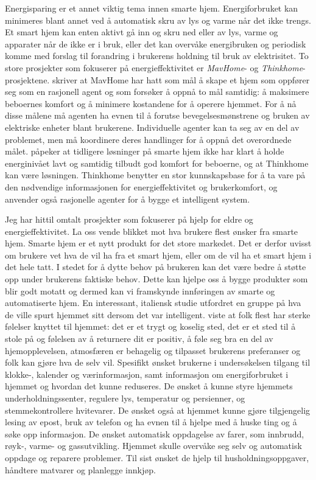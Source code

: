 Energisparing er et annet viktig tema innen smarte hjem. Energiforbruket kan minimeres blant annet ved å automatisk skru av lys og varme når det ikke trengs. Et smart hjem kan enten aktivt gå inn og skru ned eller av lys, varme og apparater når de ikke er i bruk, eller det kan overvåke energibruken og periodisk komme med forslag til forandring i brukerens holdning til bruk av elektrisitet. To store prosjekter som fokuserer på energieffektivitet er \emph{MavHome}- og \emph{Thinkhome}-prosjektene. \citet{mavhome} skriver at MavHome har hatt som mål å skape et hjem som oppfører seg som en rasjonell agent og som forsøker å oppnå to mål samtidig: å maksimere beboernes komfort og å minimere kostandene for å operere hjemmet. For å nå disse målene må agenten ha evnen til å forutse bevegelsesmønstrene og bruken av elektriske enheter blant brukerene. Individuelle agenter kan ta seg av en del av problemet, men må koordinere deres handlinger for å oppnå det overordnede målet. \citet{thinkhome} påpeker at tidligere løsninger på smarte hjem ikke har klart å holde energinivået lavt og samtidig tilbudt god komfort for beboerne, og at Thinkhome kan være løsningen. Thinkhome benytter en stor kunnskapsbase for å ta vare på den nødvendige informasjonen for energieffektivitet og brukerkomfort, og anvender også rasjonelle agenter for å bygge et intelligent system.

Jeg har hittil omtalt prosjekter som fokuserer på hjelp for eldre og energieffektivitet. La oss vende blikket mot hva brukere flest ønsker fra smarte hjem. Smarte hjem er et nytt produkt for det store markedet. Det er derfor uvisst om brukere vet hva de vil ha fra et smart hjem, eller om de vil ha et smart hjem i det hele tatt. I stedet for å dytte behov på brukeren kan det være bedre å støtte opp under brukerens faktiske behov. Dette kan hjelpe oss å bygge produkter som blir godt motatt og dermed kan vi framskynde innføringen av smarte og automatiserte hjem. En interessant, italiensk studie utfordret en gruppe på hva de ville spurt hjemmet sitt dersom det var intelligent. \citet{bonino11} viste at folk flest har sterke følelser knyttet til hjemmet: det er et trygt og koselig sted, det er et sted til å stole på og følelsen av å returnere dit er positiv, å føle seg bra en del av hjemopplevelsen, atmosfæren er behagelig og tilpasset brukerens preferanser og folk kan gjøre hva de selv vil. Spesifikt ønsket brukerne i undersøkelsen tilgang til klokke-, kalender og værinformasjon, samt informasjon om energiforbruket i hjemmet og hvordan det kunne reduseres. De ønsket å kunne styre hjemmets underholdningssenter, regulere lys, temperatur og persienner, og stemmekontrollere hvitevarer. De ønsket også at hjemmet kunne gjøre tilgjengelig lesing av epost, bruk av telefon og ha evnen til å hjelpe med å huske ting og å søke opp informasjon. De ønsket automatisk oppdagelse av farer, som innbrudd, røyk-, varme- og gassutvikling. Hjemmet skulle overvåke seg selv og automatisk oppdage og reparere problemer. Til sist ønsket de hjelp til husholdningsoppgaver, håndtere matvarer og planlegge innkjøp.

